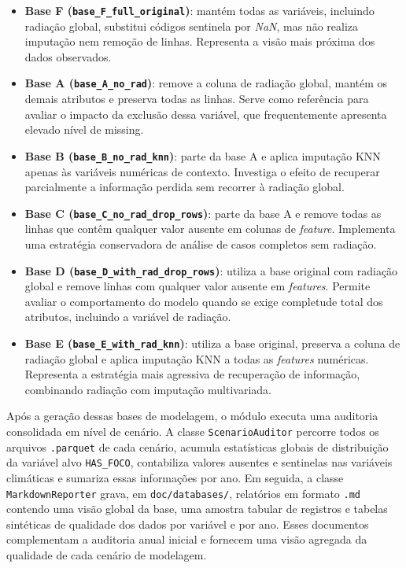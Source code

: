 \begin{itemize}
    \item \textbf{Base F (\texttt{base\_F\_full\_original})}: mantém todas as variáveis, incluindo radiação global, substitui códigos sentinela por \textit{NaN}, mas não realiza imputação nem remoção de linhas. Representa a visão mais próxima dos dados observados.
    \item \textbf{Base A (\texttt{base\_A\_no\_rad})}: remove a coluna de radiação global, mantém os demais atributos e preserva todas as linhas. Serve como referência para avaliar o impacto da exclusão dessa variável, que frequentemente apresenta elevado nível de missing.
    \item \textbf{Base B (\texttt{base\_B\_no\_rad\_knn})}: parte da base A e aplica imputação KNN apenas às variáveis numéricas de contexto. Investiga o efeito de recuperar parcialmente a informação perdida sem recorrer à radiação global.
    \item \textbf{Base C (\texttt{base\_C\_no\_rad\_drop\_rows})}: parte da base A e remove todas as linhas que contêm qualquer valor ausente em colunas de \textit{feature}. Implementa uma estratégia conservadora de análise de casos completos sem radiação.
    \item \textbf{Base D (\texttt{base\_D\_with\_rad\_drop\_rows})}: utiliza a base original com radiação global e remove linhas com qualquer valor ausente em \textit{features}. Permite avaliar o comportamento do modelo quando se exige completude total dos atributos, incluindo a variável de radiação.
    \item \textbf{Base E (\texttt{base\_E\_with\_rad\_knn})}: utiliza a base original, preserva a coluna de radiação global e aplica imputação KNN a todas as \textit{features} numéricas. Representa a estratégia mais agressiva de recuperação de informação, combinando radiação com imputação multivariada.
\end{itemize}

Após a geração dessas bases de modelagem, o módulo  executa uma auditoria consolidada em nível de cenário. A classe \texttt{ScenarioAuditor} percorre todos os arquivos \texttt{.parquet} de cada cenário, acumula estatísticas globais de distribuição da variável alvo \texttt{HAS\_FOCO}, contabiliza valores ausentes e sentinelas nas variáveis climáticas e sumariza essas informações por ano. Em seguida, a classe \texttt{MarkdownReporter} grava, em \texttt{doc/databases/}, relatórios em formato \texttt{.md} contendo uma visão global da base, uma amostra tabular de registros e tabelas sintéticas de qualidade dos dados por variável e por ano. Esses documentos complementam a auditoria anual inicial e fornecem uma visão agregada da qualidade de cada cenário de modelagem.

